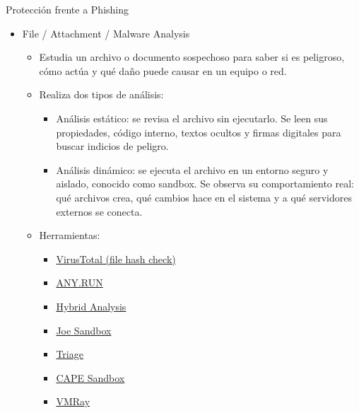 \documentclass[aspectratio=169,11pt]{beamer}
\begin{document}
\begin{frame}[allowframebreaks]{Protección frente a Phishing}
\begin{itemize}
  \item File / Attachment / Malware Analysis
    \begin{itemize}
    \item Estudia un archivo o documento sospechoso para saber si es peligroso, cómo actúa y qué daño puede causar en un equipo o red.
    \item Realiza dos tipos de análisis:
      \begin{itemize}
      \item Análisis estático: se revisa el archivo sin ejecutarlo. Se leen sus propiedades, código interno, textos ocultos y firmas digitales para buscar indicios de peligro.
      \item Análisis dinámico: se ejecuta el archivo en un entorno seguro y aislado, conocido como sandbox. Se observa su comportamiento real: qué archivos crea, qué cambios hace en el sistema y a qué servidores externos se conecta.
      \end{itemize}
    \item Herramientas:
      \begin{itemize}
      \item \href{https://www.virustotal.com/gui/home/search}{VirusTotal (file hash check)}
      \item \href{https://any.run/}{ANY.RUN}
      \item \href{https://www.hybrid-analysis.com/}{Hybrid Analysis}
      \item \href{https://www.joesandbox.com/\#windows}{Joe Sandbox}
      \item \href{https://tria.ge/dashboard}{Triage}
      \item \href{https://github.com/kevoreilly/CAPEv2}{CAPE Sandbox}
      \item \href{https://www.vmray.com/try-vmray-products/}{VMRay}
      \end{itemize}
    \end{itemize}


\end{itemize}
\end{frame}
\end{document}
